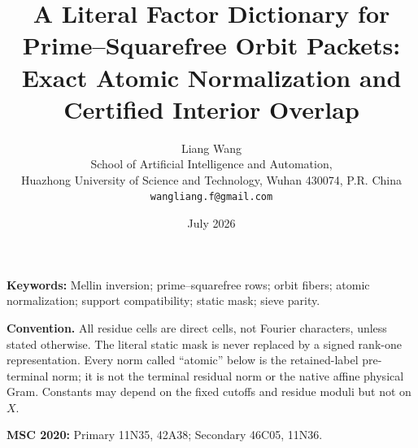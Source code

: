 \documentclass[11pt]{article}
\title{\bfseries A Literal Factor Dictionary for Prime--Squarefree Orbit Packets:\\
Exact Atomic Normalization and Certified Interior Overlap}
\author{Liang Wang\\
\small School of Artificial Intelligence and Automation,\\[-2pt]
\small Huazhong University of Science and Technology, Wuhan 430074, P.R. China\\
\small \texttt{wangliang.f@gmail.com}}
\date{July 2026}
\theoremstyle{definition}
\theoremstyle{remark}
\begin{document}
\maketitle



\noindent\textbf{Keywords:} Mellin inversion; prime--squarefree rows;
orbit fibers; atomic normalization; support compatibility; static mask;
sieve parity.

\medskip
\noindent\textbf{Convention.}
All residue cells are direct cells, not Fourier characters, unless stated
otherwise.  The literal static mask is never replaced by a signed
rank-one representation.  Every norm called ``atomic'' below is the
retained-label pre-terminal norm; it is not the terminal residual norm or
the native affine physical Gram.  Constants may depend on the fixed
cutoffs and residue moduli but not on \(X\).

\medskip
\noindent\textbf{MSC 2020:} Primary 11N35, 42A38; Secondary 46C05,
11N36.









\begingroup
\small
\raggedright
\setlength{\bibsep}{4pt plus 1pt minus 1pt}


\endgroup
\end{document}
